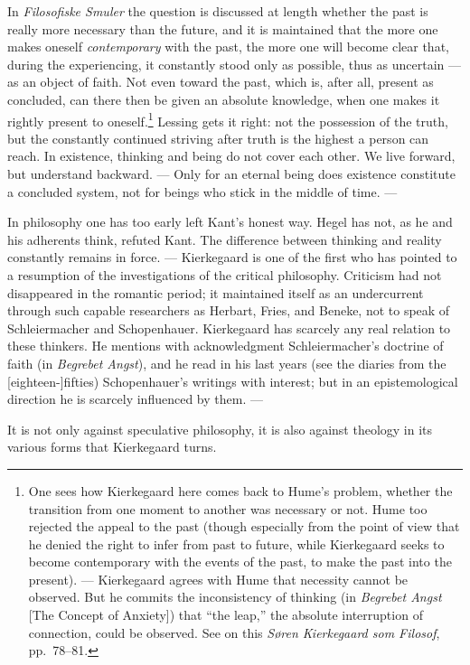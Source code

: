 \documentclass[12pt,a4paper]{book}
\newcommand{\opage}[1]{\marginnote{\footnotesize\textit{[#1]}}}
\begin{document}
In \emph{Filosofiske Smuler} the question is discussed at length whether the past is really
more necessary than the future, and it is maintained that the more one makes oneself
\emph{contemporary} with the past, the more one will become clear that, during the
experiencing, it constantly stood only as possible, thus as uncertain --- as an object of
faith. Not even toward the past, which is, after all, present as concluded, can there then
be given an absolute knowledge, when one makes it rightly present to
oneself.\footnote{One sees how Kierkegaard here comes back to Hume's problem, whether the
transition from one moment to another was necessary or not. Hume too rejected the appeal to
the past (though especially from the point of view that he denied the right to infer from
past to future, while Kierkegaard seeks to become contemporary with the events of the past,
to make the past into the present). --- Kierkegaard agrees with Hume that necessity cannot
be observed. But he commits the inconsistency of thinking (in \emph{Begrebet Angst} [The
Concept of Anxiety]) that ``the leap,'' the absolute interruption of connection, could be
observed. See on this \emph{Søren Kierkegaard som Filosof}, pp.~78--81.} Lessing gets it
right: not the possession of the truth, but the \opage{153}constantly continued striving after truth
is the highest a person can reach. In existence, thinking and being do not cover each other.
We live forward, but understand backward. --- Only for an eternal being does existence
constitute a concluded system, not for beings who stick in the middle of time. ---

In philosophy one has too early left Kant's honest way. Hegel has not, as he and his
adherents think, refuted Kant. The difference between thinking and reality constantly
remains in force. --- Kierkegaard is one of the first who has pointed to a resumption of the
investigations of the critical philosophy. Criticism had not disappeared in the romantic
period; it maintained itself as an undercurrent through such capable researchers as Herbart,
Fries, and Beneke, not to speak of Schleiermacher and Schopenhauer. Kierkegaard has scarcely
any real relation to these thinkers. He mentions with acknowledgment Schleiermacher's
doctrine of faith (in \emph{Begrebet Angst}), and he read in his last years (see the diaries
from the [eighteen-]fifties) Schopenhauer's writings with interest; but in an epistemological
direction he is scarcely influenced by them. ---

It is not only against speculative philosophy, it is also against theology in its various
forms that Kierkegaard turns.
\end{document}
